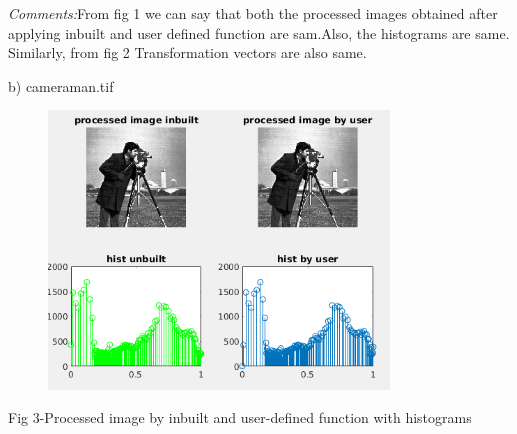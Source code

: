 \documentclass[12pt]{article}
\begin{document}
\vspace{\baselineskip}
\begin{adjustwidth}{1.0in}{0.0in}
\begin{justify}
\textit{Comments:}From fig 1 we can say that both the processed images obtained after applying inbuilt and user defined function are sam.Also, the histograms are same. Similarly, from fig 2 Transformation vectors are also same.
\end{justify}\par

\end{adjustwidth}


\vspace{\baselineskip}
\begin{justify}
\tab b) cameraman.tif
\end{justify}\par


\vspace{\baselineskip}



\begin{figure}[H]
	\begin{Center}
		\includegraphics[width=3.57in,height=2.91in]{./media/image17.png}
	\end{Center}
\end{figure}



\tab \tab \par

\begin{adjustwidth}{1.0in}{0.0in}
\begin{Center}
Fig 3-Processed image by inbuilt and user-defined function with histograms
\end{Center}\par

\end{adjustwidth}
\end{document}

